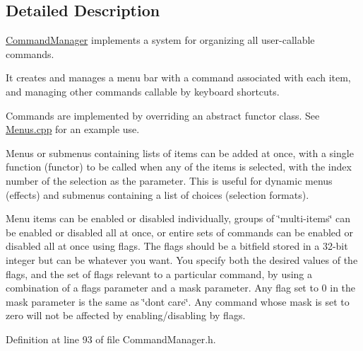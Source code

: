 

\subsection{Detailed Description}
\hyperlink{class_command_manager}{Command\+Manager} implements a system for organizing all user-\/callable commands. 

It creates and manages a menu bar with a command associated with each item, and managing other commands callable by keyboard shortcuts.

Commands are implemented by overriding an abstract functor class. See \hyperlink{_menus_8cpp}{Menus.\+cpp} for an example use.

Menus or submenus containing lists of items can be added at once, with a single function (functor) to be called when any of the items is selected, with the index number of the selection as the parameter. This is useful for dynamic menus (effects) and submenus containing a list of choices (selection formats).

Menu items can be enabled or disabled individually, groups of \char`\"{}multi-\/items\char`\"{} can be enabled or disabled all at once, or entire sets of commands can be enabled or disabled all at once using flags. The flags should be a bitfield stored in a 32-\/bit integer but can be whatever you want. You specify both the desired values of the flags, and the set of flags relevant to a particular command, by using a combination of a flags parameter and a mask parameter. Any flag set to 0 in the mask parameter is the same as \char`\"{}don\textquotesingle{}t care\char`\"{}. Any command whose mask is set to zero will not be affected by enabling/disabling by flags. 

Definition at line 93 of file Command\+Manager.\+h.




